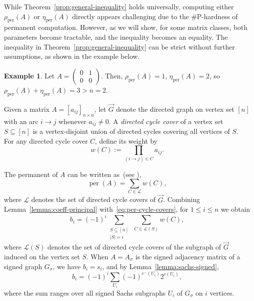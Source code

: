 \documentclass[11pt]{article}
\DeclareMathOperator{\per}{per}
\theoremstyle{plain}
\theoremstyle{definition}
\newtheorem{example}[theorem]{Example}
\theoremstyle{remark}
\begin{document}
 While Theorem~\ref{prop:general-inequality} holds universally, computing either \(\rho_{\operatorname{per}}(A)\) or \(\eta_{\operatorname{per}}(A)\) directly appears challenging due to the \#P-hardness of permanent computation. However, as we will show, for some matrix classes, both parameters become tractable, and the inequality becomes an equality.
The inequality in Theorem~\ref{prop:general-inequality} can be strict without further assumptions, as shown in the example below.
\begin{example} \label{example_gen}
Let 
\(
A = \begin{pmatrix}
  0 &  1 \\
  0 &  0
\end{pmatrix}.
\)
Then,
\(
\rho_{\per}(A) = 1 \), \( \eta_{\per}(A) = 2 \), so
\(
\rho_{\per}(A) + \eta_{\per}(A) = 3 > n = 2.
\)

\end{example}



Given a matrix \(A=[a_{ij}]_{n\times n}\), let \(\vec G\) denote the directed graph
on vertex set \([n]\) with an arc \(i\to j\) whenever \(a_{ij}\neq 0\).
A \emph{directed cycle cover} of a vertex set \(S\subseteq[n]\) is a vertex-disjoint union of directed cycles covering all vertices of \(S\).
For any directed cycle cover \(C\), define its weight by
\[
w(C):=\prod_{(i\to j)\in C} a_{ij}.
\]

The permanent of \(A\) can be written as~(see \cite{BrualdiCvetkovic2008}),
\begin{equation}\label{eq:per-cycle-covers}
\per(A)=\sum_{C\in\mathcal L} w(C),
\end{equation}
where \(\mathcal L\) denotes the set of directed cycle covers of \(\vec G\).
Combining Lemma~\ref{lemma:coeff-principal} with~\eqref{eq:per-cycle-covers}, for
\(1\le i\le n\) we obtain
\begin{equation}\label{eq:bi-cycle-covers}
b_i
= (-1)^i \sum_{\substack{S\subseteq[n]\\ |S|=i}}
\ \sum_{C\in\mathcal L(S)} w(C),
\end{equation}
where \(\mathcal L(S)\) denotes the set of directed cycle covers of the subgraph of
\(\vec G\) induced on the vertex set \(S\).
When \(A=A_\sigma\) is the signed adjacency matrix of a signed graph \(G_\sigma\),
we have \(b_i=s_i\), and by Lemma~\ref{lemma:sachs-signed},
\begin{equation}\label{eq:bi-sachs}
b_i = (-1)^i \sum_{U_i} (-1)^{c^-(U_i)} 2^{c(U_i)},
\end{equation}
where the sum ranges over all signed Sachs subgraphs \(U_i\) of \(G_\sigma\) on \(i\)
vertices.
\end{document}
